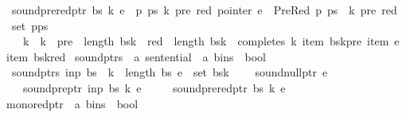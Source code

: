 \begin{isabellebody}
\ \ {\isachardoublequoteopen}sound{\isacharunderscore}{\kern0pt}prered{\isacharunderscore}{\kern0pt}ptr\ bs\ k\ e\ {\isasymequiv}\ {\isasymforall}p\ ps\ k{\isacharprime}{\kern0pt}\ pre\ red{\isachardot}{\kern0pt}\ pointer\ e\ {\isacharequal}{\kern0pt}\ PreRed\ p\ ps\ {\isasymand}\ {\isacharparenleft}{\kern0pt}k{\isacharprime}{\kern0pt}{\isacharcomma}{\kern0pt}\ pre{\isacharcomma}{\kern0pt}\ red{\isacharparenright}{\kern0pt}\ {\isasymin}\ set\ {\isacharparenleft}{\kern0pt}p{\isacharhash}{\kern0pt}ps{\isacharparenright}{\kern0pt}\ {\isasymlongrightarrow}\isanewline
\ \ \ \ k{\isacharprime}{\kern0pt}\ {\isacharless}{\kern0pt}\ k\ {\isasymand}\ pre\ {\isacharless}{\kern0pt}\ length\ {\isacharparenleft}{\kern0pt}bs{\isacharbang}{\kern0pt}k{\isacharprime}{\kern0pt}{\isacharparenright}{\kern0pt}\ {\isasymand}\ red\ {\isacharless}{\kern0pt}\ length\ {\isacharparenleft}{\kern0pt}bs{\isacharbang}{\kern0pt}k{\isacharparenright}{\kern0pt}\ {\isasymand}\ completes\ k\ {\isacharparenleft}{\kern0pt}item\ {\isacharparenleft}{\kern0pt}bs{\isacharbang}{\kern0pt}k{\isacharprime}{\kern0pt}{\isacharbang}{\kern0pt}pre{\isacharparenright}{\kern0pt}{\isacharparenright}{\kern0pt}\ {\isacharparenleft}{\kern0pt}item\ e{\isacharparenright}{\kern0pt}\ {\isacharparenleft}{\kern0pt}item\ {\isacharparenleft}{\kern0pt}bs{\isacharbang}{\kern0pt}k{\isacharbang}{\kern0pt}red{\isacharparenright}{\kern0pt}{\isacharparenright}{\kern0pt}{\isachardoublequoteclose}\isanewline
\isanewline
{}\isamarkupfalse%
\ sound{\isacharunderscore}{\kern0pt}ptrs\ {\isacharcolon}{\kern0pt}{\isacharcolon}{\kern0pt}\ {\isachardoublequoteopen}{\isacharprime}{\kern0pt}a\ sentential\ {\isasymRightarrow}\ {\isacharprime}{\kern0pt}a\ bins\ {\isasymRightarrow}\ bool{\isachardoublequoteclose}\ \isanewline
\ \ {\isachardoublequoteopen}sound{\isacharunderscore}{\kern0pt}ptrs\ inp\ bs\ {\isasymequiv}\ {\isasymforall}k\ {\isacharless}{\kern0pt}\ length\ bs{\isachardot}{\kern0pt}\ {\isasymforall}e\ {\isasymin}\ set\ {\isacharparenleft}{\kern0pt}bs{\isacharbang}{\kern0pt}k{\isacharparenright}{\kern0pt}{\isachardot}{\kern0pt}\isanewline
\ \ \ \ sound{\isacharunderscore}{\kern0pt}null{\isacharunderscore}{\kern0pt}ptr\ e\ {\isasymand}\isanewline
\ \ \ \ sound{\isacharunderscore}{\kern0pt}pre{\isacharunderscore}{\kern0pt}ptr\ inp\ bs\ k\ e\ {\isasymand}\isanewline
\ \ \ \ sound{\isacharunderscore}{\kern0pt}prered{\isacharunderscore}{\kern0pt}ptr\ bs\ k\ e{\isachardoublequoteclose}\isanewline
\isanewline
{}\isamarkupfalse%
\ mono{\isacharunderscore}{\kern0pt}red{\isacharunderscore}{\kern0pt}ptr\ {\isacharcolon}{\kern0pt}{\isacharcolon}{\kern0pt}\ {\isachardoublequoteopen}{\isacharprime}{\kern0pt}a\ bins\ {\isasymRightarrow}\ bool{\isachardoublequoteclose}\ \isanewline

\end{isabellebody}
